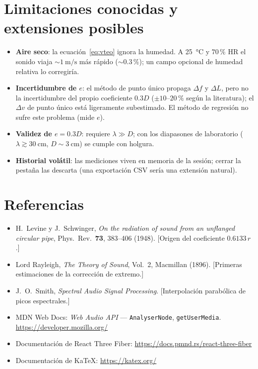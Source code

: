 \documentclass[11pt,a4paper]{article}
\begin{document}
\section{Limitaciones conocidas y extensiones posibles}

\begin{itemize}[nosep]
  \item \textbf{Aire seco}: la ecuación~\eqref{eq:vteo} ignora la humedad. A
        \SI{25}{\celsius} y $70\,\%$ HR el sonido viaja $\sim\SI{1}{\metre\per\second}$ más
        rápido ($\sim 0.3\,\%$); un campo opcional de humedad relativa lo corregiría.
  \item \textbf{Incertidumbre de $e$}: el método de punto único propaga $\Delta f$ y
        $\Delta L$, pero no la incertidumbre del propio coeficiente $0.3D$
        ($\pm 10$--$20\,\%$ según la literatura); el $\Delta v$ de punto único está
        ligeramente subestimado. El método de regresión no sufre este problema (mide $e$).
  \item \textbf{Validez de $e = 0.3D$}: requiere $\lambda \gg D$; con los diapasones de
        laboratorio ($\lambda \gtrsim \SI{30}{\centi\metre}$, $D \sim \SI{3}{\centi\metre}$)
        se cumple con holgura.
  \item \textbf{Historial volátil}: las mediciones viven en memoria de la sesión; cerrar la
        pestaña las descarta (una exportación CSV sería una extensión natural).
\end{itemize}

\section*{Referencias}
\begin{itemize}[nosep]
  \item H.~Levine y J.~Schwinger, \emph{On the radiation of sound from an unflanged circular
        pipe}, Phys.\ Rev.\ \textbf{73}, 383--406 (1948). [Origen del coeficiente $0.6133\,r$.]
  \item Lord Rayleigh, \emph{The Theory of Sound}, Vol.~2, Macmillan (1896). [Primeras
        estimaciones de la corrección de extremo.]
  \item J.~O.~Smith, \emph{Spectral Audio Signal Processing}. [Interpolación parabólica de
        picos espectrales.]
  \item MDN Web Docs: \emph{Web Audio API} --- \texttt{AnalyserNode},
        \texttt{getUserMedia}. \url{https://developer.mozilla.org/}
  \item Documentación de React Three Fiber: \url{https://docs.pmnd.rs/react-three-fiber}
  \item Documentación de KaTeX: \url{https://katex.org/}
\end{itemize}
\end{document}
